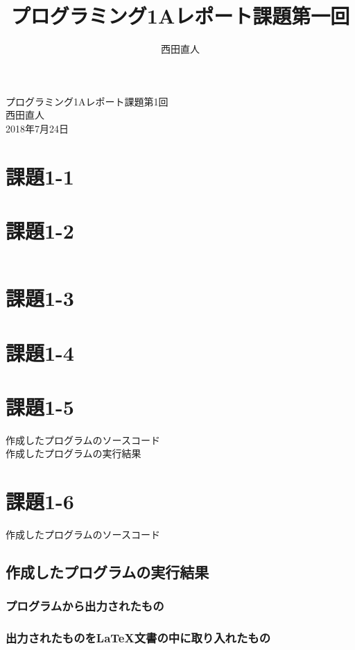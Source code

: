 \documentclass[10pt,a4paper]{jsarticle}
\title{プログラミング1Aレポート課題第一回}
\author{西田直人}
\begin{document}
\begin{center}
{\LARGE プログラミング1Aレポート課題第1回} \\
\large
西田直人 \\ 2018年7月24日
\end{center}
\normalsize
\section{課題1-1}
\noindent

\section{課題1-2}

\begin{lstlisting}[basicstyle=\ttfamily\footnotesize,frame=single]

\end{lstlisting}

\section{課題1-3}
\noindent
\section{課題1-4}








\section{課題1-5}
作成したプログラムのソースコード\\

作成したプログラムの実行結果\\


\section{課題1-6}
作成したプログラムのソースコード\\

\subsection{作成したプログラムの実行結果}
\subsubsection{プログラムから出力されたもの}


\subsubsection{出力されたものをLaTeX文書の中に取り入れたもの}
\end{document}

